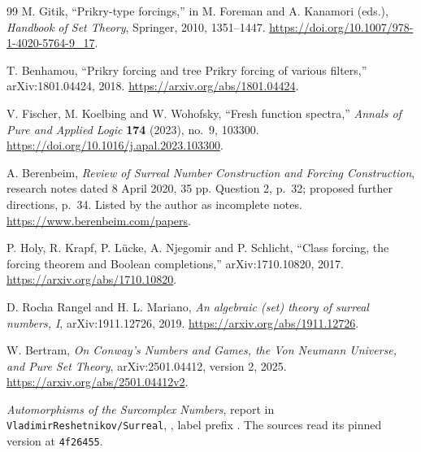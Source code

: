 \documentclass[11pt,letterpaper]{article}
\numberwithin{equation}{section}
\theoremstyle{definition}
\theoremstyle{remark}
\newcommand{\shorthash}{\texttt{4f26455}}
\newcommand{\repo}{\texttt{VladimirReshetnikov/Surreal}}
\begin{document}
\begin{thebibliography}{99}
M. Gitik, ``Prikry-type forcings,'' in M. Foreman and A. Kanamori (eds.),
\emph{Handbook of Set Theory}, Springer, 2010, 1351--1447.
\url{https://doi.org/10.1007/978-1-4020-5764-9_17}.

T. Benhamou, ``Prikry forcing and tree Prikry forcing of various filters,''
arXiv:1801.04424, 2018. \url{https://arxiv.org/abs/1801.04424}.

V. Fischer, M. Koelbing and W. Wohofsky, ``Fresh function spectra,''
\emph{Annals of Pure and Applied Logic} \textbf{174} (2023), no.~9, 103300.
\url{https://doi.org/10.1016/j.apal.2023.103300}.

A. Berenbeim, \emph{Review of Surreal Number Construction and Forcing
Construction}, research notes dated 8 April 2020, 35 pp. Question 2, p.~32;
proposed further directions, p.~34. Listed by the author as incomplete notes.
\url{https://www.berenbeim.com/papers}.

P. Holy, R. Krapf, P. L\"ucke, A. Njegomir and P. Schlicht, ``Class forcing,
the forcing theorem and Boolean completions,'' arXiv:1710.10820, 2017.
\url{https://arxiv.org/abs/1710.10820}.

D. Rocha Rangel and H. L. Mariano, \emph{An algebraic (set) theory of surreal
numbers, I}, arXiv:1911.12726, 2019. \url{https://arxiv.org/abs/1911.12726}.

W. Bertram, \emph{On Conway's Numbers and Games, the Von Neumann Universe, and
Pure Set Theory}, arXiv:2501.04412, version 2, 2025.
\url{https://arxiv.org/abs/2501.04412v2}.

\emph{Automorphisms of the Surcomplex Numbers}, report in \repo,
, label prefix
. The sources read its pinned version at \shorthash.

\end{thebibliography}
\end{document}
